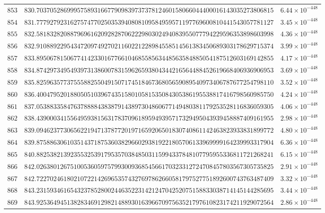 \documentclass[12pt,reqno]{amsart}
\theoremstyle{remark}
\begin{document}
\begin{longtable}{clc}
$853$ & $830.7037052869995758931667790983973737812460158066044400016143035273806815$ & $6.44\times 10^{-448}$ \\
$854$ & $831.7779279231627574770250353940808109584959571197769600810441543057781127$ & $3.45\times 10^{-448}$ \\
$855$ & $832.5818328208879696162092828706222980302494083955077794229596353898603998$ & $4.36\times 10^{-448}$ \\
$856$ & $832.9108892295434720974927021160221228984558514561383450689303178629715374$ & $3.99\times 10^{-448}$ \\
$857$ & $833.8950678150677414233016776610468558563448563584885054187512603169142855$ & $4.17\times 10^{-448}$ \\
$858$ & $834.8742973495493973138600783159626593804344216564488452619668406936906953$ & $3.69\times 10^{-448}$ \\
$859$ & $835.8259635773755588255049150717451846736805659089540973406787677254798110$ & $3.52\times 10^{-448}$ \\
$860$ & $836.4004795201880505103967435158010581535084305386195538817416798560985750$ & $4.24\times 10^{-448}$ \\
$861$ & $837.0538833584763788884383879143897304860677149480381179253528116836059305$ & $4.06\times 10^{-448}$ \\
$862$ & $838.4390003415564959381563178370961895949395717329495043939458887409161955$ & $2.98\times 10^{-448}$ \\
$863$ & $839.0946237730656221947137877201971659206501830740861142463823933831899772$ & $4.80\times 10^{-448}$ \\
$864$ & $839.8758863061035143718753603829660293819221805706133969999164239993317904$ & $6.36\times 10^{-448}$ \\
$865$ & $840.8825382139235532539179535703848503115994337848107795955336811721268241$ & $6.15\times 10^{-448}$ \\
$866$ & $842.0263801267510053605975799300936854566170323312724708457803567305735825$ & $2.91\times 10^{-448}$ \\
$867$ & $842.7227024618021072214269653574327697862660581797527751892600743763487409$ & $3.32\times 10^{-448}$ \\
$868$ & $843.2315934616543237852800244635223142124704252075158833038714145144285695$ & $3.44\times 10^{-448}$ \\
$869$ & $843.9253649451382834691298214889301639667097563521797610823174211929072564$ & $2.86\times 10^{-448}$ \\

\end{longtable}
\end{document}
